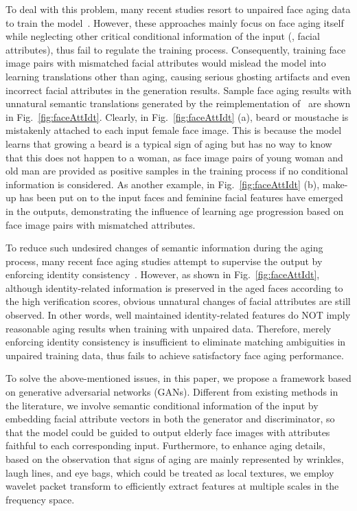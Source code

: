 \documentclass[10pt,twocolumn,letterpaper]{article}
\begin{document}
To deal with this problem, many recent studies resort to unpaired face aging data to train the model~\cite{wang2016recurrent,zhang2017age,yang2017learning,li2018global}.
However, these approaches mainly focus on face aging itself while neglecting other critical conditional information of the input (\eg, facial attributes), thus fail to regulate the training process. 
Consequently, training face image pairs with mismatched facial attributes would mislead the model into learning translations other than aging, causing serious ghosting artifacts and even incorrect facial attributes in the generation results.
Sample face aging results with unnatural semantic translations generated by the reimplementation of~\cite{yang2017learning} are shown in Fig.~\ref{fig:faceAttIdt}.
Clearly, in Fig.~\ref{fig:faceAttIdt} (a), beard or moustache is mistakenly attached to each input female face image. 
This is because the model learns that growing a beard is a typical sign of aging but has no way to know that this does not happen to a woman, as face image pairs of young woman and old man are provided as positive samples in the training process if no conditional information is considered.
As another example, in Fig.~\ref{fig:faceAttIdt} (b), make-up has been put on to the input faces and feminine facial features have emerged in the outputs, demonstrating the influence of learning age progression based on face image pairs with mismatched attributes.

To reduce such undesired changes of semantic information during the aging process, many recent face aging studies attempt to supervise the output by enforcing identity consistency~\cite{zhang2017age,antipov2017face,yang2017learning,li2018global}. 
However, as shown in Fig.~\ref{fig:faceAttIdt}, although identity-related information is preserved in the aged faces according to the high verification scores, obvious unnatural changes of facial attributes are still observed.
In other words, well maintained identity-related features do NOT imply reasonable aging results when training with unpaired data. Therefore, merely enforcing identity consistency is insufficient to eliminate matching ambiguities in unpaired training data, thus fails to achieve satisfactory face aging performance.

To solve the above-mentioned issues, in this paper, we propose a framework based on generative adversarial networks (GANs). 
Different from existing methods in the literature, we involve semantic conditional information of the input by embedding facial attribute vectors in both the generator and discriminator, so that the model could be guided to output elderly face images with attributes faithful to each corresponding input.
Furthermore, to enhance aging details, based on the observation that signs of aging are mainly represented by wrinkles, laugh lines, and eye bags, which could be treated as local textures, we employ wavelet packet transform to efficiently extract features at multiple scales in the frequency space. 
\end{document}
